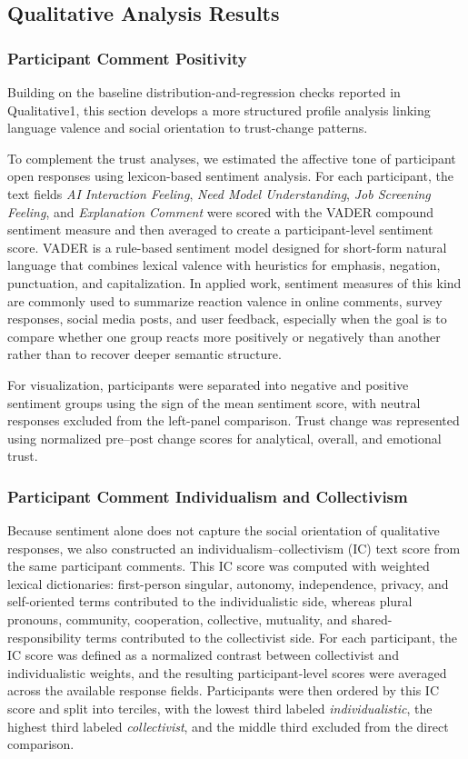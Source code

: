 \subsection{Qualitative Analysis Results}
\subsubsection{Participant Comment Positivity}
Building on the baseline distribution-and-regression checks reported in Qualitative1, this section develops a more structured profile analysis linking language valence and social orientation to trust-change patterns.

To complement the trust analyses, we estimated the affective tone of participant open responses using lexicon-based sentiment analysis. For each participant, the text fields \emph{AI Interaction Feeling}, \emph{Need Model Understanding}, \emph{Job Screening Feeling}, and \emph{Explanation Comment} were scored with the VADER compound sentiment measure and then averaged to create a participant-level sentiment score. VADER is a rule-based sentiment model designed for short-form natural language that combines lexical valence with heuristics for emphasis, negation, punctuation, and capitalization. In applied work, sentiment measures of this kind are commonly used to summarize reaction valence in online comments, survey responses, social media posts, and user feedback, especially when the goal is to compare whether one group reacts more positively or negatively than another rather than to recover deeper semantic structure.

For visualization, participants were separated into negative and positive sentiment groups using the sign of the mean sentiment score, with neutral responses excluded from the left-panel comparison. Trust change was represented using normalized pre--post change scores for analytical, overall, and emotional trust.

\subsubsection{Participant Comment Individualism and Collectivism}
Because sentiment alone does not capture the social orientation of qualitative responses, we also constructed an individualism--collectivism (IC) text score from the same participant comments. This IC score was computed with weighted lexical dictionaries: first-person singular, autonomy, independence, privacy, and self-oriented terms contributed to the individualistic side, whereas plural pronouns, community, cooperation, collective, mutuality, and shared-responsibility terms contributed to the collectivist side. For each participant, the IC score was defined as a normalized contrast between collectivist and individualistic weights, and the resulting participant-level scores were averaged across the available response fields. Participants were then ordered by this IC score and split into terciles, with the lowest third labeled \emph{individualistic}, the highest third labeled \emph{collectivist}, and the middle third excluded from the direct comparison.


